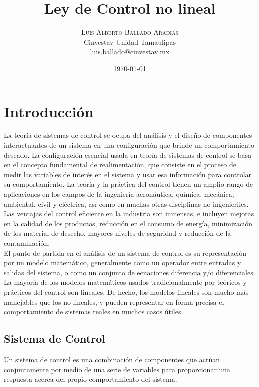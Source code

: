 \documentclass[oneside,onecolumn]{article}
\title{Ley de Control no lineal} %
\author{%
\textsc{Luis Alberto Ballado Aradias} \\%
\normalsize Cinvestav Unidad Tamaulipas \\ %
\normalsize \href{mailto:luis.ballado@cinvestav.mx}{luis.ballado@cinvestav.mx} %
}
\date{\today} %
\begin{document}
\maketitle

\section{Introducción}

\lettrine[nindent=0em,lines=3]{L}a teoría de sistemas de control se ocupa del análisis y el diseño de componentes interactuantes de un sistema en una configuración que brinde un comportamiento deseado. La configuración esencial usada en teoría de sistemas de control se basa en el concepto fundamental de realimentación, que consiste en el proceso de medir las variables de interés en el sistema y usar esa información para controlar su comportamiento. La teoría y la práctica del control tienen un amplio rango de aplicaciones en los campos de la ingeniería aeronáutica, química, mecánica, ambiental, civil y eléctrica, así como en muchas otras disciplinas no ingenieriles. Las ventajas del control eficiente en la industria son inmensas, e incluyen mejoras en la calidad de los productos, reducción en el consumo de energía, minimización de los material de desecho, mayores niveles de seguridad y reducción de la contaminación.\\

El punto de partida en el análisis de un sistema de control es su representación por un modelo matemático, generalmente como un operador entre entradas y salidas del sistema, o como un conjunto de ecuaciones diferencia y/o diferenciales. La mayoría de los modelos matemáticos usados tradicionalmente por teóricos y prácticos del control son lineales. De hecho, los modelos lineales son mucho más manejables que los no lineales, y pueden representar en forma precisa el comportamiento de sistemas reales en muchos casos útiles.

\subsection{Sistema de Control} %

Un sistema de control es una combinación de componentes que actúan conjuntamente por medio de una serie de variables para proporcionar una respuesta acerca del propio comportamiento del sistema.\\
\end{document}

